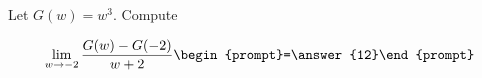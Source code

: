 \documentclass{ximera}
\author{Bart Snapp}
\begin{document}
\begin{exercise}
Let $G(w) = w^3$. Compute

\[
\lim_{ w\to -2 } 
\frac{G(w)-G(-2)}{w+2} \begin{prompt}=\answer{12}\end{prompt}
\]
\end{exercise}
\end{document}
